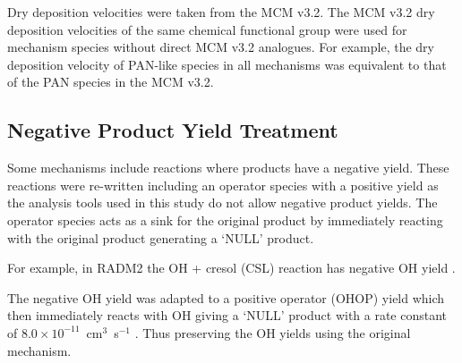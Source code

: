 Dry deposition velocities were taken from the MCM v3.2. 
The MCM v3.2 dry deposition velocities of the same chemical functional group were used for mechanism species without direct MCM v3.2 analogues. 
For example, the dry deposition velocity of PAN-like species in all mechanisms was equivalent to that of the PAN species in the MCM v3.2.

\subsection{Negative Product Yield Treatment}

Some mechanisms include reactions where products have a negative yield. 
These reactions were re-written including an operator species with a positive yield as the analysis tools used in this study do not allow negative product yields. 
The operator species acts as a sink for the original product by immediately reacting with the original product generating a `NULL' product. 

For example, in RADM2 the OH + cresol (CSL) reaction has negative OH yield .
\begin{reactionlist}
\end{reactionlist}
The negative OH yield was adapted to a positive operator (OHOP) yield  which then immediately reacts with OH giving a `NULL' product with a rate constant of \mbox{$8.0 \times 10^{-11}$ cm$^3$ s$^{-1}$} . 
Thus preserving the OH yields using the original mechanism.
\begin{reactionlist}
\end{reactionlist}
